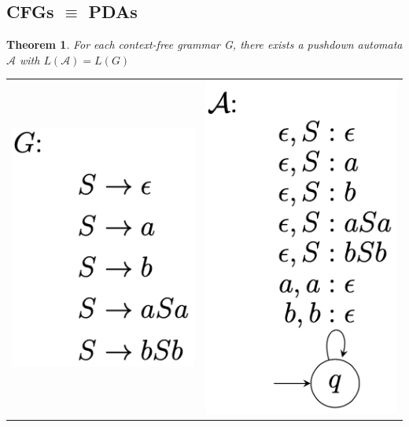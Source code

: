 \documentclass[a3paper, 8pt]{extarticle}
\newtheorem{theorem}{Theorem}[section]
\begin{document}
\begin{multicols*}{6}
\subsection{CFGs $\equiv$ PDAs}
\begin{theorem}
For each context-free grammar G, there exists a pushdown automata $\mathcal{A}$ with $L(\mathcal{A}) = L(G)$
\end{theorem}
\centering
\begin{tabular}{c c}\includegraphics[align=t, width=0.26\columnwidth]{images/Screen Shot 2023-01-12 at 10.33.28.png} & \includegraphics[align=t, width=0.28\columnwidth]{images/Screen Shot 2023-01-12 at 10.33.40.png} \\
\end{tabular}
\raggedright

\end{multicols*}
\end{document}
